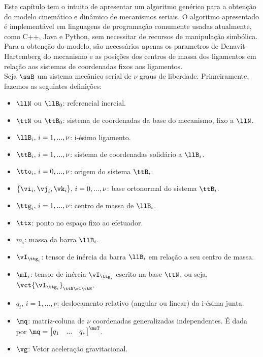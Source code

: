 \documentclass[]{politex}
\begin{document}
Este capítulo tem o intuito de apresentar um algoritmo genérico para a obtenção do modelo cinemático e dinâmico de mecanismos seriais. O algoritmo apresentado é implementável em linguagens de programação comumente usadas atualmente, como C++, Java e Python, sem necessitar de recursos de manipulação simbólica. \\
Para a obtenção do modelo, são necessários apenas os parametros de Denavit-Hartemberg \cite{Craig, Denavit, Lipkin, Cabral} do mecanismo e as posições dos centros de massa dos ligamentos em relação aos sistemas de coordenadas fixos aos ligamentos. \\ 

Seja $\ssB$ um sistema mecânico serial de $\nu$ graus de liberdade. Primeiramente, fazemos as seguintes definições:

\begin{itemize}
\item $\llN$ ou $\llB_0$: referencial inercial.
\item $\ttN$ ou $\ttB_0$: sistema de coordenadas da base do mecanismo, fixo a $\llN$.
\item $\llB_i, \,i=1,...,\nu$: i-ésimo ligamento.
\item $\ttB_i, \,i=1,...,\nu$: sistema de coordenadas solid\'ario a $\llB_i$.
\item $\tto_i, \,i=0,...,\nu$: origem do sistema $\ttB_i$.
\item $\{\vi_i, \vj_i, \vk_i\}, \,i=0,...,\nu$: base ortonormal do sistema $\ttB_i$.
\item $\ttg_i, \,i=1,...,\nu$: centro de massa de $\llB_i$.
\item $\ttx$: ponto no espa\c{c}o fixo ao efetuador.
\item $m_i$: massa da barra $\llB_i$.
\item $\vI_{\ttg_i}$: tensor de in\'ercia da barra $\llB_i$ em relação a seu centro de massa.
\item $\mI_i$: tensor de in\'ercia $\vI_{\ttg_i}$ escrito na base $\ttN$, ou seja, $\vct{\vI_{\ttg_i}}_{\ttN \rl \ttN}$.
\item $q_i, \,i=1,...,\nu$: deslocamento relativo (angular ou linear) da i-ésima junta.
\item  $\mq$: matriz-coluna de $\nu$ coordenadas generalizadas independentes. É dada por $\mq = \begin{bmatrix}
q_1 & ... & {q}_{\nu}
\end{bmatrix}^\msT $.
\item $\vg$: Vetor aceleração gravitacional.

\end{itemize}
\end{document}
